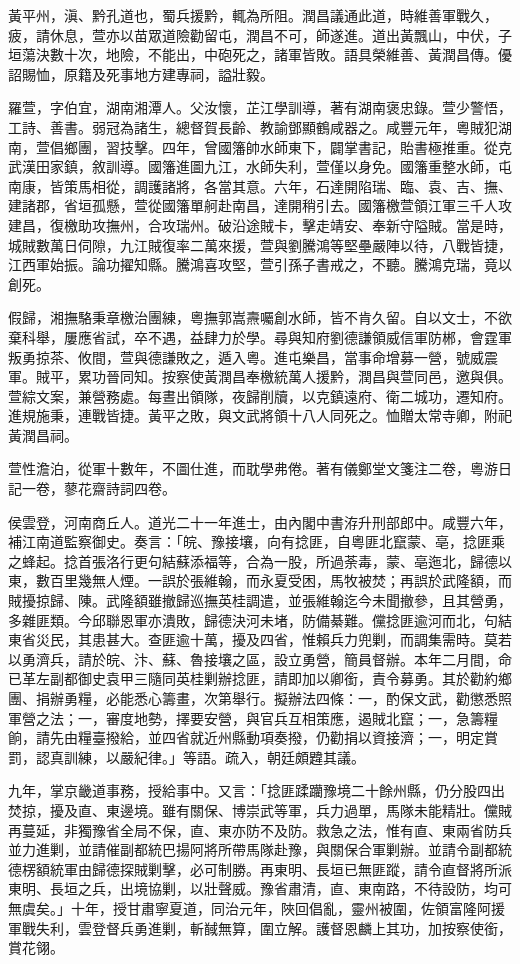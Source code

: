 \begin{pinyinscope}
黃平州，滇、黔孔道也，蜀兵援黔，輒為所阻。潤昌議通此道，時維善軍戰久，疲，請休息，萱亦以苗眾道險勸留屯，潤昌不可，師遂進。道出黃飄山，中伏，子垣蕩決數十次，地險，不能出，中砲死之，諸軍皆敗。語具榮維善、黃潤昌傳。優詔賜恤，原籍及死事地方建專祠，謚壯毅。

羅萱，字伯宜，湖南湘潭人。父汝懷，芷江學訓導，著有湖南褒忠錄。萱少警悟，工詩、善書。弱冠為諸生，總督賀長齡、教諭鄧顯鶴咸器之。咸豐元年，粵賊犯湖南，萱倡鄉團，習技擊。四年，曾國籓帥水師東下，闢掌書記，貽書極推重。從克武漢田家鎮，敘訓導。國籓進圖九江，水師失利，萱僅以身免。國籓重整水師，屯南康，皆策馬相從，調護諸將，各當其意。六年，石達開陷瑞、臨、袁、吉、撫、建諸郡，省垣孤懸，萱從國籓單舸赴南昌，達開稍引去。國籓檄萱領江軍三千人攻建昌，復檄助攻撫州，合攻瑞州。破沿途賊卡，擊走靖安、奉新守隘賊。當是時，城賊數萬日伺隙，九江賊復率二萬來援，萱與劉騰鴻等堅壘嚴陣以待，八戰皆捷，江西軍始振。論功擢知縣。騰鴻喜攻堅，萱引孫子書戒之，不聽。騰鴻克瑞，竟以創死。

假歸，湘撫駱秉章檄治團練，粵撫郭嵩燾囑創水師，皆不肯久留。自以文士，不欲棄科舉，屢應省試，卒不遇，益肆力於學。尋與知府劉德謙領威信軍防郴，會霆軍叛勇掠茶、攸間，萱與德謙敗之，遁入粵。進屯樂昌，當事命增募一營，號威震軍。賊平，累功晉同知。按察使黃潤昌奉檄統萬人援黔，潤昌與萱同邑，邀與俱。萱綜文案，兼營務處。每晝出領隊，夜歸削牘，以克鎮遠府、衛二城功，遷知府。進規施秉，連戰皆捷。黃平之敗，與文武將領十八人同死之。恤贈太常寺卿，附祀黃潤昌祠。

萱性澹泊，從軍十數年，不圖仕進，而耽學弗倦。著有儀鄭堂文箋注二卷，粵游日記一卷，蓼花齋詩詞四卷。

侯雲登，河南商丘人。道光二十一年進士，由內閣中書洊升刑部郎中。咸豐六年，補江南道監察御史。奏言：「皖、豫接壤，向有捻匪，自粵匪北竄蒙、亳，捻匪乘之蜂起。捻首張洛行更句結蘇添福等，合為一股，所過荼毒，蒙、亳迤北，歸德以東，數百里幾無人煙。一誤於張維翰，而永夏受困，馬牧被焚；再誤於武隆額，而賊擾掠歸、陳。武隆額雖撤歸巡撫英桂調遣，並張維翰迄今未聞撤參，且其營勇，多雜匪類。今邱聯恩軍亦潰敗，歸德決河未堵，防備綦難。儻捻匪逾河而北，句結東省災民，其患甚大。查匪逾十萬，擾及四省，惟賴兵力兜剿，而調集需時。莫若以勇濟兵，請於皖、汴、蘇、魯接壤之區，設立勇營，簡員督辦。本年二月間，命已革左副都御史袁甲三隨同英桂剿辦捻匪，請即加以卿銜，責令募勇。其於勸約鄉團、捐辦勇糧，必能悉心籌畫，次第舉行。擬辦法四條：一，酌保文武，勸懲悉照軍營之法；一，審度地勢，擇要安營，與官兵互相策應，遏賊北竄；一，急籌糧餉，請先由糧臺撥給，並四省就近州縣動項奏撥，仍勸捐以資接濟；一，明定賞罰，認真訓練，以嚴紀律。」等語。疏入，朝廷頗韙其議。

九年，掌京畿道事務，授給事中。又言：「捻匪蹂躪豫境二十餘州縣，仍分股四出焚掠，擾及直、東邊境。雖有關保、博崇武等軍，兵力過單，馬隊未能精壯。儻賊再蔓延，非獨豫省全局不保，直、東亦防不及防。救急之法，惟有直、東兩省防兵並力進剿，並請催副都統巴揚阿將所帶馬隊赴豫，與關保合軍剿辦。並請令副都統德楞額統軍由歸德探賊剿擊，必可制勝。再東明、長垣已無匪蹤，請令直督將所派東明、長垣之兵，出境協剿，以壯聲威。豫省肅清，直、東南路，不待設防，均可無虞矣。」十年，授甘肅寧夏道，同治元年，陜回倡亂，靈州被圍，佐領富隆阿援軍戰失利，雲登督兵勇進剿，斬馘無算，圍立解。護督恩麟上其功，加按察使銜，賞花翎。


\end{pinyinscope}
